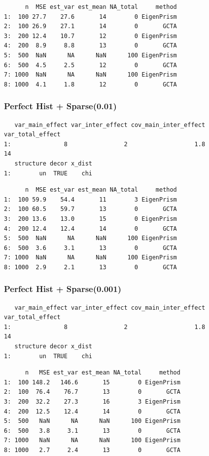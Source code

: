 \documentclass[]{article}
\begin{document}
\begin{verbatim}
      n  MSE est_var est_mean NA_total     method
1:  100 27.7    27.6       14        0 EigenPrism
2:  100 26.9    27.1       14        0       GCTA
3:  200 12.4    10.7       12        0 EigenPrism
4:  200  8.9     8.8       13        0       GCTA
5:  500  NaN      NA      NaN      100 EigenPrism
6:  500  4.5     2.5       12        0       GCTA
7: 1000  NaN      NA      NaN      100 EigenPrism
8: 1000  4.1     1.8       12        0       GCTA
\end{verbatim}

\subsubsection{Perfect Hist +
Sparse(0.01)}\label{perfect-hist-sparse0.01}

\begin{verbatim}
   var_main_effect var_inter_effect cov_main_inter_effect var_total_effect
1:               8                2                   1.8               14
   structure decor x_dist
1:        un  TRUE    chi
\end{verbatim}

\begin{verbatim}
      n  MSE est_var est_mean NA_total     method
1:  100 59.9    54.4       11        3 EigenPrism
2:  100 60.5    59.7       13        0       GCTA
3:  200 13.6    13.0       15        0 EigenPrism
4:  200 12.4    12.4       14        0       GCTA
5:  500  NaN      NA      NaN      100 EigenPrism
6:  500  3.6     3.1       13        0       GCTA
7: 1000  NaN      NA      NaN      100 EigenPrism
8: 1000  2.9     2.1       13        0       GCTA
\end{verbatim}

\subsubsection{Perfect Hist +
Sparse(0.001)}\label{perfect-hist-sparse0.001}

\begin{verbatim}
   var_main_effect var_inter_effect cov_main_inter_effect var_total_effect
1:               8                2                   1.8               14
   structure decor x_dist
1:        un  TRUE    chi
\end{verbatim}

\begin{verbatim}
      n   MSE est_var est_mean NA_total     method
1:  100 148.2   146.6       15        0 EigenPrism
2:  100  76.4    76.7       13        0       GCTA
3:  200  32.2    27.3       16        3 EigenPrism
4:  200  12.5    12.4       14        0       GCTA
5:  500   NaN      NA      NaN      100 EigenPrism
6:  500   3.8     3.1       13        0       GCTA
7: 1000   NaN      NA      NaN      100 EigenPrism
8: 1000   2.7     2.4       13        0       GCTA
\end{verbatim}
\end{document}
